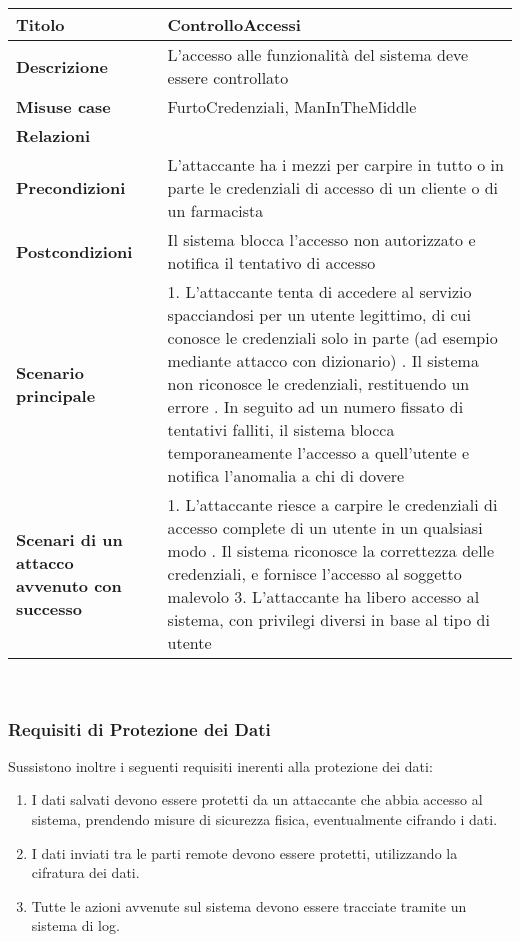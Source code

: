 \begin{tabular} {|P{4cm}|P{13cm}|}
\hline
  \textbf{Titolo} & ControlloAccessi\\
\hline
  \textbf{Descrizione} & L'accesso alle funzionalità del sistema deve essere controllato\\
\hline
  \textbf{Misuse case} & FurtoCredenziali, ManInTheMiddle\\
\hline
  \textbf{Relazioni} &\\
\hline
  \textbf{Precondizioni} & L'attaccante ha i mezzi per carpire in tutto o in
  parte le credenziali di accesso di un cliente o di un farmacista\\
\hline
  \textbf{Postcondizioni} & Il sistema blocca l'accesso non autorizzato e
  notifica il tentativo di accesso\\
\hline
  \textbf{Scenario principale} & 1. L'attaccante tenta di accedere al servizio
  spacciandosi per un utente legittimo, di cui conosce le credenziali solo in
  parte (ad esempio mediante attacco con dizionario) . Il sistema non
  riconosce le credenziali, restituendo un errore . In seguito ad un numero
  fissato di tentativi falliti, il sistema blocca temporaneamente l'accesso a
  quell'utente e notifica l'anomalia a chi di dovere\\
\hline
  \textbf{Scenari di un attacco avvenuto con successo} & 1. L'attaccante riesce
  a carpire le credenziali di accesso complete di un utente in un qualsiasi
  modo . Il sistema riconosce la correttezza delle credenziali, e fornisce
  l'accesso al soggetto malevolo 3. L'attaccante ha libero accesso al sistema,
  con privilegi diversi in base al tipo di utente\\
\hline
\end{tabular}
\\

\subsubsection{Requisiti di Protezione dei Dati}

Sussistono inoltre i seguenti requisiti inerenti alla protezione dei dati: 
\begin{enumerate}
 \item I dati salvati devono essere protetti da un attaccante che abbia accesso al sistema, prendendo misure
di sicurezza fisica, eventualmente cifrando i dati. 
 \item I dati inviati tra le parti remote devono essere protetti, utilizzando la cifratura dei
dati. 
 \item Tutte le azioni avvenute sul sistema devono essere tracciate
tramite un sistema di log. 
\end{enumerate}

